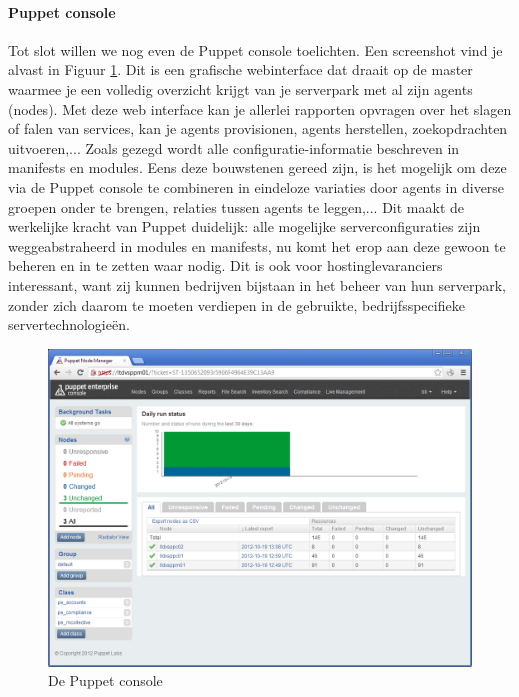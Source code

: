 \documentclass[a4paper,11pt]{article}
\theoremstyle{definition}
\begin{document}
\paragraph{Puppet console} Tot slot willen we nog even de Puppet console toelichten.
Een screenshot vind je alvast in Figuur \ref{console}. Dit is een grafische webinterface dat draait op de master waarmee je een volledig overzicht krijgt van je serverpark 
met al zijn agents (nodes). Met deze web interface kan je allerlei rapporten opvragen over het slagen of falen van services,
kan je agents provisionen, agents herstellen, zoekopdrachten uitvoeren,... Zoals gezegd wordt alle configuratie-informatie 
beschreven in manifests en modules. Eens deze bouwstenen gereed zijn, is het 
mogelijk om deze via de Puppet console te combineren in eindeloze variaties door agents in diverse 
groepen onder te brengen, relaties tussen agents te leggen,... Dit maakt de 
werkelijke kracht van Puppet duidelijk: alle mogelijke serverconfiguraties zijn
weggeabstraheerd in modules en manifests, nu komt het erop aan deze gewoon te 
beheren en in te zetten waar nodig. Dit is ook voor hostinglevaranciers 
interessant, want zij kunnen bedrijven bijstaan in het beheer van hun 
serverpark, zonder zich daarom te moeten verdiepen in de gebruikte, bedrijfsspecifieke 
servertechnologieën.
\begin{figure}[h]
  \centering
  \includegraphics[scale=0.4]{puppetconsole.png}\caption{De Puppet console}\label{console}
\end{figure}
\end{document}
